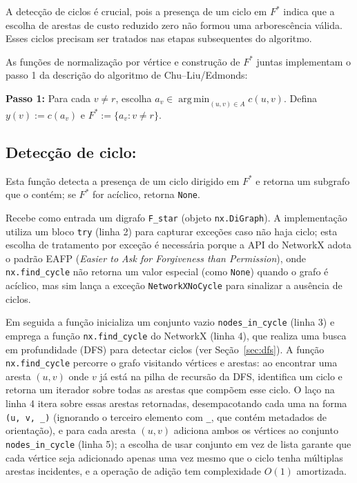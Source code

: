 A detecção de ciclos é crucial, pois a presença de um ciclo em \(F^*\) indica que a escolha de arestas de custo reduzido zero não formou uma arborescência válida. Esses ciclos precisam ser tratados nas etapas subsequentes do algoritmo.

As funções de normalização por vértice e construção de \(F^*\) juntas implementam o passo 1 da descrição do algoritmo de Chu–Liu/Edmonds:

\begin{tcolorbox}[
        enhanced, breakable,
        colframe=green!60!black, colback=green!5,
        colbacktitle=green!20, coltitle=black,
        title={Passo 1 do Algoritmo de Chu–Liu/Edmonds},
        boxed title style={sharp corners, boxrule=0.6pt},
        sharp corners, boxrule=0.6pt
    ]
    \textbf{Passo 1:} Para cada \(v\neq r\), escolha \(a_v\in\mathop{\mathrm{arg\,min}}_{(u,v)\in A} c(u,v)\). Defina \(y(v):=c(a_v)\) e \(F^*:=\{a_v : v\neq r\}\).
\end{tcolorbox}



\subsection{Detecção de ciclo:}
Esta função detecta a presença de um ciclo dirigido em \(F^*\) e retorna um subgrafo que o contém; se \(F^*\) for acíclico, retorna \texttt{None}.

Recebe como entrada um digrafo \texttt{F\_star} (objeto \texttt{nx.DiGraph}). A implementação utiliza um bloco \texttt{try} (linha 2) para capturar exceções caso não haja ciclo; esta escolha de tratamento por exceção é necessária porque a API do NetworkX adota o padrão EAFP (\emph{Easier to Ask for Forgiveness than Permission}), onde \texttt{nx.find\_cycle} não retorna um valor especial (como \texttt{None}) quando o grafo é acíclico, mas sim lança a exceção \texttt{NetworkXNoCycle} para sinalizar a ausência de ciclos.

Em seguida a função inicializa um conjunto vazio \texttt{nodes\_in\_cycle} (linha 3) e emprega a função \texttt{nx.find\_cycle} do NetworkX (linha 4), que realiza uma busca em profundidade (DFS) para detectar ciclos (ver Seção~\ref{sec:dfs}). A função \texttt{nx.find\_cycle} percorre o grafo visitando vértices e arestas: ao encontrar uma aresta \((u,v)\) onde \(v\) já está na pilha de recursão da DFS, identifica um ciclo e retorna um iterador sobre todas as arestas que compõem esse ciclo. O laço na linha 4 itera sobre essas arestas retornadas, desempacotando cada uma na forma \texttt{(u, v, \_)} (ignorando o terceiro elemento com \texttt{\_}, que contém metadados de orientação), e para cada aresta \((u,v)\) adiciona ambos os vértices ao conjunto \texttt{nodes\_in\_cycle} (linha 5); a escolha de usar conjunto em vez de lista garante que cada vértice seja adicionado apenas uma vez mesmo que o ciclo tenha múltiplas arestas incidentes, e a operação de adição tem complexidade \(O(1)\) amortizada.

